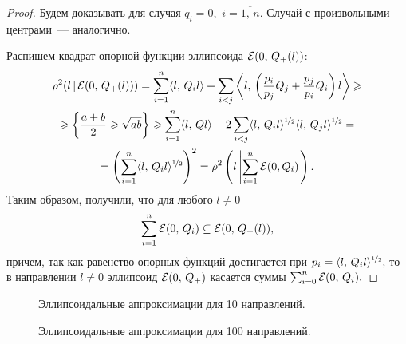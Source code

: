 \begin{proof}

Будем доказывать для случая $q_i = 0,$ $i = \overline{1,\,n}$. Случай с произвольными центрами~--- аналогично.

Распишем квадрат опорной функции эллипсоида $\mathcal{E}(0,\,Q_+(l))$:
\begin{multline*}
        \rho^2(l\,|\,\mathcal{E}(0,\,Q_+(l)))
        =
        \sum_{i=1}^{n}
        \langle
        l,\,Q_il
        \rangle
        +
        \sum_{i < j}
        \left\langle
l,\,\left(
\frac{p_i}{p_j}Q_j + \frac{p_j}{p_i}Q_i
\right)l
        \right\rangle
        \geqslant\\\geqslant
        \left\{
\frac{a+b}{2} \geqslant \sqrt{ab}
        \right\}
        \geqslant
        \sum_{i=1}^{n}\langle l,\,Ql \rangle
        +
        2\sum_{i < j}
        \langle l,\,Q_il \rangle^{\nicefrac12}
        \langle l,\,Q_jl \rangle^{\nicefrac12}
        =\\=
        \left(
\sum_{i=1}^n\langle l,\,Q_il\rangle^{\nicefrac12}
        \right)^2
        =
        \rho^2\left(
l\left|
        \sum_{i=1}^n\mathcal{E}(0, Q_i)
\right.
        \right).
\end{multline*}
Таким образом, получили, что для любого $l \neq 0$
$$
        \sum_{i=1}^n \mathcal{E}(0,\,Q_i) \subseteq \mathcal{E}(0,\,Q_+(l)),
$$
причем, так как равенство опорных функций достигается при
$
        p_i = \langle l,\,Q_i l \rangle^{\nicefrac12},
$
то в направлении $l \neq 0$ эллипсоид $\mathcal{E}(0,\,Q_+)$ касается суммы $\sum_{i = 0}^{n} \mathcal{E}(0,\,Q_i).$

\end{proof}

\clearpage
\begin{figure}[t]
        \centering
        
        \caption{Эллипсоидальные аппроксимации для 10 направлений.}
\end{figure}
\begin{figure}[b]
        \centering
        
        \caption{Эллипсоидальные аппроксимации для 100 направлений.}
\end{figure}




\clearpage
\begin{thebibliography}{9}

\end{thebibliography}
